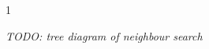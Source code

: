 \documentclass{beamer}
\begin{document}
\begin{frame}
\begin{animateinline}[%
    controls={step},
    buttonsize=10pt
]{1}
\end{animateinline}
\end{frame}


\begin{frame}
    \textit{TODO: tree diagram of neighbour search}
\end{frame}
\end{document}
